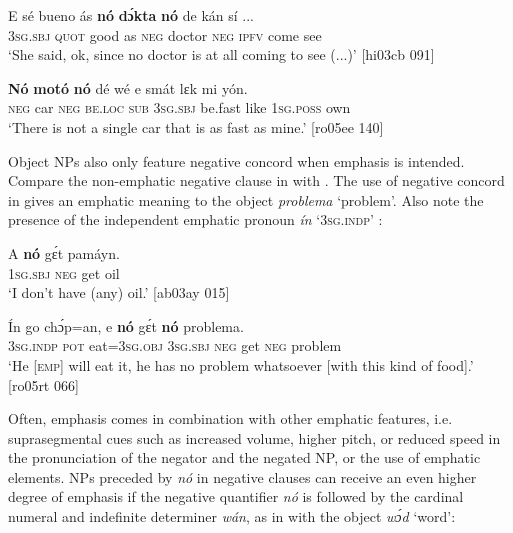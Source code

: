 \ea%
    \label{ex:key:550}
    \gll E    sé    bueno  ás  \textbf{nó}  \textbf{dɔ́kta}  \textbf{nó}  de  kán    sí    \op...\cp{}\\
\textsc{3sg.sbj}  \textsc{quot}    good  as  \textsc{neg}  doctor  \textsc{neg}  \textsc{ipfv}  come  see\\

\glt ‘She said, ok, since no doctor is at all coming to see (...)’ [hi03cb 091]
\z


\ea%
    \label{ex:key:551}
    \gll \textbf{Nó}  \textbf{motó}  \textbf{nó}  dé    wé  e    smát  lɛk  mi    yón.\\
\textsc{neg}  car    \textsc{neg}  \textsc{be.loc}  \textsc{sub}  \textsc{3sg.sbj}  be.fast  like  \textsc{1sg.poss}  own\\

\glt ‘There is not a single car that is as fast as mine.’ [ro05ee 140]
\z

Object NPs also only feature negative concord when emphasis is intended. Compare the non-emphatic negative clause in  with . The use of  negative concord in  gives an emphatic meaning to the object \textit{problema} `problem'. Also note the presence of the independent emphatic pronoun \textit{ín} ‘\textsc{3sg.indp}’ :


\ea%
    \label{ex:key:552}
    \gll A    \textbf{nó}  gɛ́t  pamáyn.\\
\textsc{1sg.sbj}  \textsc{neg}  get  oil\\

\glt ‘I don’t have (any) oil.’ [ab03ay 015]
\z


\ea%
    \label{ex:key:553}
    \gll \'{I}n    go  chɔ́p=an,    e    \textbf{nó}  gɛ́t  \textbf{nó}  problema.\\
\textsc{3sg.indp}  \textsc{pot}  eat=\textsc{3sg.obj}  \textsc{3sg.sbj}  \textsc{neg}  get  \textsc{neg}  problem\\

\glt ‘He [\textsc{emp}] will eat it, he has no problem whatsoever [with this kind of food].’ [ro05rt 066]
\z


Often, emphasis comes in combination with other emphatic features, i.e. suprasegmental cues such as increased volume, higher pitch, or reduced speed in the pronunciation of the negator and the negated \textsc{NP,} or the use of emphatic elements. NPs preceded by \textit{nó} in negative clauses can receive an even higher degree of emphasis if the negative quantifier \textit{nó} is followed by the cardinal numeral and indefinite determiner \textit{wán}, as in  with the object \textit{wɔ́d} ‘word’:


